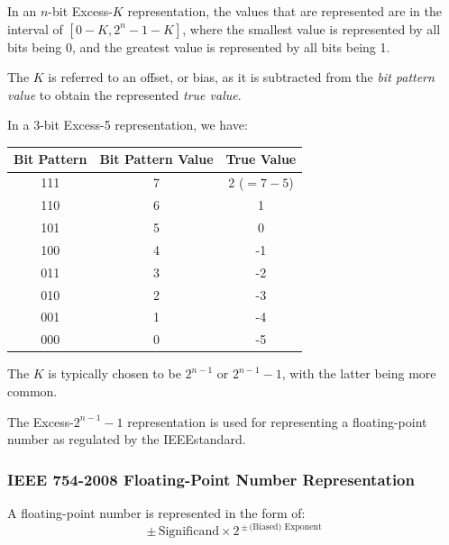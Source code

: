 \begin{definition}
    In an $n$-bit Excess-$K$ representation, the values that are represented are in the interval of
    $[0 - K, 2^n - 1 - K]$, where the smallest value is represented by all bits being 0, and the
    greatest value is represented by all bits being 1.

    The $K$ is referred to an offset, or bias, as it is subtracted from the \textit{bit pattern value} to
    obtain the represented \textit{true value}.

    \begin{example}
        In a 3-bit Excess-5 representation, we have:

        \centering
        \begin{tabular}{|c|c|c|}
            \hline
            Bit Pattern & Bit Pattern Value & True Value \\
            \hline
            111 & 7 & 2 ($=7-5$) \\
            110 & 6 & 1 \\
            101 & 5 & 0 \\
            100 & 4 & -1 \\
            011 & 3 & -2 \\
            010 & 2 & -3 \\
            001 & 1 & -4 \\
            000 & 0 & -5 \\
            \hline
        \end{tabular}
    \end{example}

    The $K$ is typically chosen to be $2^{n-1}$ or $2^{n-1} - 1$, with the latter being more common.

    The Excess-$2^{n-1} - 1$ representation is used for representing a floating-point number
    as regulated by the IEEE\footnotemark standard.
\end{definition}


\subsubsection{IEEE 754-2008 Floating-Point Number Representation}

\begin{definition}
    A floating-point number is represented in the form of:
    \[\pm\,\text{Significand}\times 2^{\,\pm\,\text{(Biased) Exponent}}\]
\end{definition}

